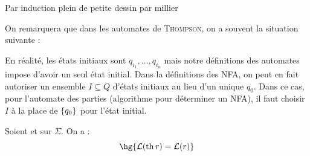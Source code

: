    \begin{nproof}{Par induction}
        plein de petite dessin par millier 
        
    \end{nproof}
    
    On remarquera que dans les automates de \textsc{Thompson}, on a souvent la situation suivante :
    \begin{tikzpicture}
        
    \end{tikzpicture}
    En réalité, les  états initiaux sont $q_{i_1}, \dots, q_{i_n}$ mais notre définitions des automates impose d'avoir un seul état initial. Dans la définitions des NFA, on peut en fait autoriser un ensemble $I \subseteq Q$ d'états initiaux au lieu d'un unique $q_0$. Dans ce cas, pour l'automate des parties (algorithme pour déterminer un NFA), il faut choisir $I$ à la place de $\ens{q_0}$ pour l'état initial.
    
    \begin{theorem}{}{}
        Soient  et  sur $\Sigma$. On a :
        \[ \hg{\bcL\p{\th r} = \bcL\p{r}}\]
    \end{theorem}
    
